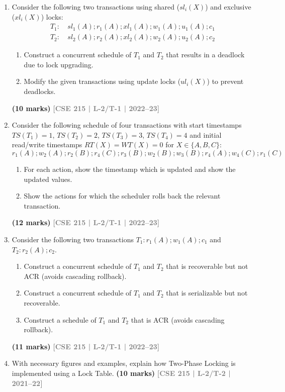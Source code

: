 \documentclass[12pt]{article}
\newcommand{\yr}[1]{\hfill\textcolor{gray}{\small\textbf{[#1]}}}
\newcommand{\mk}[1]{\textcolor{orange!70!black}{\small\textbf{(#1 marks)}}}
\begin{document}
\begin{enumerate}
\item Consider the following two transactions using shared ($sl_i(X)$) and exclusive ($xl_i(X)$) locks:
\begin{align*}
T_1\colon &\ sl_1(A); r_1(A); xl_1(A); w_1(A); u_1(A); c_1\\
T_2\colon &\ sl_2(A); r_2(A); xl_2(A); w_2(A); u_2(A); c_2
\end{align*}
\begin{enumerate}
  \item Construct a concurrent schedule of $T_1$ and $T_2$ that results in a deadlock due to lock upgrading.
  \item Modify the given transactions using update locks ($ul_i(X)$) to prevent deadlocks.
\end{enumerate}
\mk{10} \yr{CSE 215 | L-2/T-1 | 2022--23}


\item Consider the following schedule of four transactions with start timestamps $TS(T_1)=1$, $TS(T_2)=2$, $TS(T_3)=3$, $TS(T_4)=4$ and initial read/write timestamps $RT(X)=WT(X)=0$ for $X \in \{A,B,C\}$:
\[r_1(A); w_2(A); r_2(B); r_4(C); r_3(B); w_2(B); w_3(B); r_4(A); w_4(C); r_1(C)\]
\begin{enumerate}
  \item For each action, show the timestamp which is updated and show the updated values.
  \item Show the actions for which the scheduler rolls back the relevant transaction.
\end{enumerate}
\mk{12} \yr{CSE 215 | L-2/T-1 | 2022--23}


\item Consider the following two transactions $T_1\colon r_1(A); w_1(A); c_1$ and $T_2\colon r_2(A); c_2$.
\begin{enumerate}
  \item Construct a concurrent schedule of $T_1$ and $T_2$ that is recoverable but not ACR (avoids cascading rollback).
  \item Construct a concurrent schedule of $T_1$ and $T_2$ that is serializable but not recoverable.
  \item Construct a schedule of $T_1$ and $T_2$ that is ACR (avoids cascading rollback).
\end{enumerate}
\mk{11} \yr{CSE 215 | L-2/T-1 | 2022--23}


\item With necessary figures and examples, explain how Two-Phase Locking is implemented using a Lock Table.
\mk{10} \yr{CSE 215 | L-2/T-2 | 2021--22}



\end{enumerate}
\end{document}
